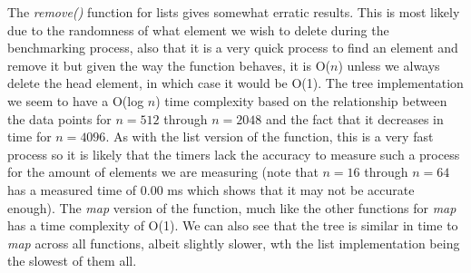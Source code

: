 \documentclass[a4paper,11pt]{article}
\begin{document}
 The \textit{remove()} function for lists gives somewhat erratic results. This is most likely due to the randomness of what element we wish to delete during the benchmarking process, also that it is a very quick process to find an element and remove it but given the way the function behaves, it is O($n$) unless we always delete the head element, in which case it would be O(1). The tree implementation we seem to have a O(log $n$) time complexity based on the relationship between the data points for $n = 512$ through $n = 2048$ and the fact that it decreases in time for $n = 4096$. As with the list version of the function, this is a very fast process so it is likely that the timers lack the accuracy to measure such a process for the amount of elements we are measuring (note that $n = 16$ through $n = 64$ has a measured time of 0.00 ms which shows that it may not be accurate enough). The \textit{map} version of the function, much like the other functions for \textit{map} has a time complexity of O(1). We can also see that the tree is similar in time to \textit{map} across all functions, albeit slightly slower, wth the list implementation being the slowest of them all.
\end{document}
